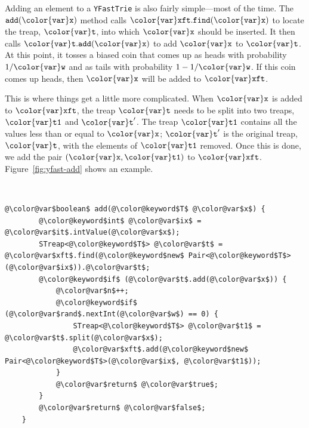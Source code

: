 \documentclass[10pt]{book}
\newcommand{\figref}[1]{Figure~\ref{fig:#1}}
\theoremstyle{plain}
\theoremstyle{definition}
\begin{document}
Adding an element to a \texttt{YFastTrie} is also fairly simple---most of
the time.  The \ensuremath{\mathtt{add({\color{var}x})}} method calls \ensuremath{\mathtt{{\color{var}xft}.find({\color{var}x})}} to locate the treap,
\ensuremath{\mathtt{{\color{var}t}}}, into which \ensuremath{\mathtt{{\color{var}x}}} should be inserted.  It then calls \ensuremath{\mathtt{{\color{var}t}.add({\color{var}x})}} to
add \ensuremath{\mathtt{{\color{var}x}}} to \ensuremath{\mathtt{{\color{var}t}}}.  At this point, it tosses a biased coin that comes up as
heads with probability $1/\ensuremath{\mathtt{{\color{var}w}}}$ and as tails with probability $1-1/\ensuremath{\mathtt{{\color{var}w}}}$.
If this coin comes up heads, then \ensuremath{\mathtt{{\color{var}x}}} will be added to \ensuremath{\mathtt{{\color{var}xft}}}.

This is where things get a little more complicated.  When \ensuremath{\mathtt{{\color{var}x}}} is added to
\ensuremath{\mathtt{{\color{var}xft}}}, the treap \ensuremath{\mathtt{{\color{var}t}}} needs to be split into two treaps, \ensuremath{\mathtt{{\color{var}t1}}} and \ensuremath{\mathtt{{\color{var}t}'}}.
The treap \ensuremath{\mathtt{{\color{var}t1}}} contains all the values less than or equal to \ensuremath{\mathtt{{\color{var}x}}};
\ensuremath{\mathtt{{\color{var}t}'}} is the original treap, \ensuremath{\mathtt{{\color{var}t}}}, with the elements of \ensuremath{\mathtt{{\color{var}t1}}} removed.
Once this is done, we add the pair \ensuremath{\mathtt{({\color{var}x},{\color{var}t1})}} to \ensuremath{\mathtt{{\color{var}xft}}}.  \figref{yfast-add}
shows an example.


 \ \vspace{.5ex}\begin{Verbatim}[gobble=1,tabsize=2,frame=single,framerule=1.2pt,commandchars=\\@\$,label=\texttt{YFastTrie},labelposition=topline]
	@\color@var$boolean$ add(@\color@keyword$T$ @\color@var$x$) {
		@\color@keyword$int$ @\color@var$ix$ = @\color@var$it$.intValue(@\color@var$x$);
		STreap<@\color@keyword$T$> @\color@var$t$ = @\color@var$xft$.find(@\color@keyword$new$ Pair<@\color@keyword$T$>(@\color@var$ix$)).@\color@var$t$;
		@\color@keyword$if$ (@\color@var$t$.add(@\color@var$x$)) {
			@\color@var$n$++;
			@\color@keyword$if$ (@\color@var$rand$.nextInt(@\color@var$w$) == 0) {
				STreap<@\color@keyword$T$> @\color@var$t1$ = @\color@var$t$.split(@\color@var$x$);
				@\color@var$xft$.add(@\color@keyword$new$ Pair<@\color@keyword$T$>(@\color@var$ix$, @\color@var$t1$));
			}
			@\color@var$return$ @\color@var$true$;
		} 
		@\color@var$return$ @\color@var$false$;
	}
\end{Verbatim}
\end{document}
